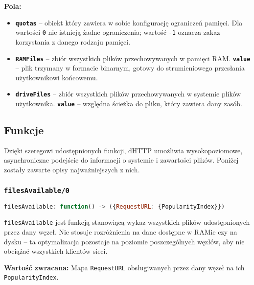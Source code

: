 \textbf{Pola:}
\begin{itemize}
    \item \textbf{\texttt{quotas}} -- obiekt który zawiera w sobie konfigurację ograniczeń pamięci. Dla wartości \texttt{0} nie istnieją żadne ograniczenia; wartość \texttt{-1} oznacza zakaz korzystania z danego rodzaju pamięci.
    \item \textbf{\texttt{RAMFiles}} -- zbiór wszystkich plików przechowywanych w pamięci RAM.
    \subitem  \textbf{\texttt{value}} -- plik trzymany w formacie binarnym, gotowy do strumieniowego przesłania użytkownikowi końcowemu.
    \item \textbf{\texttt{driveFiles}} -- zbiór wszystkich plików przechowywanych w systemie plików użytkownika.
    \subitem  \textbf{\texttt{value}} -- względna ścieżka do pliku, który zawiera dany zasób.
\end{itemize}



\subsection{Funkcje}
\label{sub:functions}

Dzięki szeregowi udostępnionych funkcji, dHTTP umożliwia wysokopoziomowe, asynchroniczne podejście do informacji o systemie i zawartości plików. Poniżej zostały zawarte opisy najważniejszych z nich.

\subsubsection{\texttt{filesAvailable/0}}
\begin{lstlisting}[language=javascript]
    filesAvailable: function() -> ({RequestURL: {PopularityIndex}})
\end{lstlisting}
\texttt{filesAvailable} jest funkcją stanowiącą wykaz wszystkich plików udostępnionych przez dany węzeł. Nie stosuje rozróżnienia na dane dostępne w RAMie czy na dysku -- ta optymalizacja pozostaje na poziomie poszczególnych węzłów, aby nie obciążać wszystkich klientów sieci.

\textbf{Wartość zwracana:}
Mapa \texttt{RequestURL} obsługiwanych przez dany węzeł na ich \texttt{PopularityIndex}.



